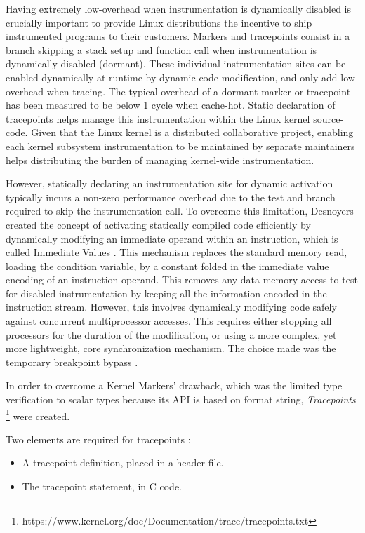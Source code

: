 Having extremely low-overhead when instrumentation is dynamically disabled is
crucially important to provide Linux distributions the incentive to ship
instrumented programs to their customers. Markers and tracepoints consist in a
branch skipping a stack setup and function call when instrumentation is
dynamically disabled (dormant). These individual instrumentation sites can be
enabled dynamically at runtime by dynamic code modification, and only add low
overhead when tracing. The typical overhead of a dormant marker or tracepoint
has been measured to be below 1 cycle \cite{marker-perf} when cache-hot. Static
declaration of tracepoints helps manage this instrumentation within the Linux
kernel source-code. Given that the Linux kernel is a distributed collaborative
project, enabling each kernel subsystem instrumentation to be maintained by
separate maintainers helps distributing the burden of managing kernel-wide
instrumentation.  

However, statically declaring an instrumentation site for dynamic activation
typically incurs a non-zero performance overhead due to the test and branch
required to skip the instrumentation call. To overcome this limitation,
Desnoyers created the concept of activating statically compiled code
efficiently by dynamically modifying an immediate operand within an
instruction, which is called Immediate Values \cite{marker-perf}. This
mechanism replaces the standard memory read, loading the condition variable, by
a constant folded in the immediate value encoding of an instruction operand.
This removes any data memory access to test for disabled instrumentation by
keeping all the information encoded in the instruction stream. However, this
involves dynamically modifying code safely against concurrent multiprocessor
accesses. This requires either stopping all processors for the duration of the
modification, or using a more complex, yet more lightweight, core
synchronization mechanism. The choice made was the temporary breakpoint bypass
\cite{bp-bypass}.

In order to overcome a Kernel Markers' drawback, which was the limited type
verification to scalar types because its API is based on format string,
\textit{Tracepoints}
\footnote{https://www.kernel.org/doc/Documentation/trace/tracepoints.txt} were
created.

Two elements are required for tracepoints :
\begin{itemize}
\item A tracepoint definition, placed in a header file.
\item The tracepoint statement, in C code.
\end{itemize}

